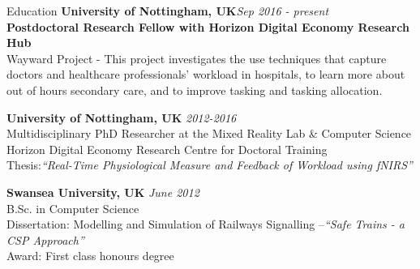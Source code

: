 \documentclass{resume} %
\begin{document}

\begin{rSection}{Education}
{\bf University of Nottingham, UK}\hfill {\em Sep 2016 - present}\\
{\bf Postdoctoral Research Fellow with Horizon Digital Economy Research Hub}\\
Wayward Project -  This project investigates the use techniques that capture doctors and healthcare professionals' workload in hospitals, to learn more about out of hours secondary care, and to improve tasking and tasking allocation.
	
	
{\bf University of Nottingham, UK} \hfill {\em 2012-2016} \\
Multidisciplinary PhD Researcher at the Mixed Reality Lab \& Computer Science \\
Horizon Digital Economy Research Centre for Doctoral Training \\
Thesis:\emph{``Real-Time Physiological Measure and Feedback of Workload using fNIRS''} \smallskip \\
\vspace{-1 mm}

{\bf Swansea University, UK} \hfill {\em June 2012} \\
B.Sc. in Computer Science \\
Dissertation: Modelling and Simulation of Railways Signalling –\emph{``Safe Trains - a CSP Approach''}\smallskip \\
Award: First class honours degree

\end{rSection}
\end{document}
